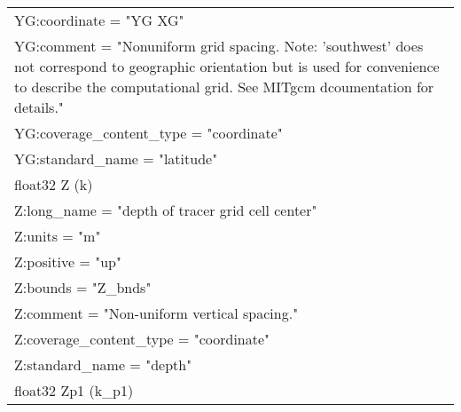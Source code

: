 \begin{longtable}{|p{\textwidth}|}
\rowcolor{Apricot}\hspace{0.5cm}\hspace{0.5cm}YG:coordinate = "YG XG"\\
\rowcolor{Apricot}\hspace{0.5cm}\hspace{0.5cm}YG:comment = "Nonuniform grid spacing. Note: 'southwest' does not correspond to geographic orientation but is used for convenience to describe the computational grid. See MITgcm dcoumentation for details."\\
\rowcolor{Apricot}\hspace{0.5cm}\hspace{0.5cm}YG:coverage\_content\_type = "coordinate"\\
\rowcolor{Apricot}\hspace{0.5cm}\hspace{0.5cm}YG:standard\_name = "latitude"\\
\rowcolor{Apricot}\hspace{0.5cm}float32 Z (k)\\
\rowcolor{Apricot}\hspace{0.5cm}\hspace{0.5cm}Z:long\_name = "depth of tracer grid cell center"\\
\rowcolor{Apricot}\hspace{0.5cm}\hspace{0.5cm}Z:units = "m"\\
\rowcolor{Apricot}\hspace{0.5cm}\hspace{0.5cm}Z:positive = "up"\\
\rowcolor{Apricot}\hspace{0.5cm}\hspace{0.5cm}Z:bounds = "Z\_bnds"\\
\rowcolor{Apricot}\hspace{0.5cm}\hspace{0.5cm}Z:comment = "Non-uniform vertical spacing."\\
\rowcolor{Apricot}\hspace{0.5cm}\hspace{0.5cm}Z:coverage\_content\_type = "coordinate"\\
\rowcolor{Apricot}\hspace{0.5cm}\hspace{0.5cm}Z:standard\_name = "depth"\\
\rowcolor{Apricot}\hspace{0.5cm}float32 Zp1 (k\_p1)\\

\end{longtable}
